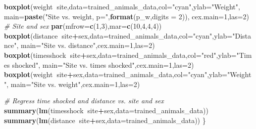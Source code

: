 \documentclass[]{article}
\newenvironment{Shaded}{\begin{snugshade}}{\end{snugshade}}
\newcommand{\KeywordTok}[1]{\textcolor[rgb]{0.13,0.29,0.53}{\textbf{#1}}}
\newcommand{\DataTypeTok}[1]{\textcolor[rgb]{0.13,0.29,0.53}{#1}}
\newcommand{\DecValTok}[1]{\textcolor[rgb]{0.00,0.00,0.81}{#1}}
\newcommand{\StringTok}[1]{\textcolor[rgb]{0.31,0.60,0.02}{#1}}
\newcommand{\CommentTok}[1]{\textcolor[rgb]{0.56,0.35,0.01}{\textit{#1}}}
\newcommand{\OperatorTok}[1]{\textcolor[rgb]{0.81,0.36,0.00}{\textbf{#1}}}
\newcommand{\NormalTok}[1]{#1}
\begin{document}
\begin{Shaded}
\begin{Highlighting}[]
  \KeywordTok{boxplot}\NormalTok{(weight}\OperatorTok{~}\NormalTok{site,}\DataTypeTok{data=}\NormalTok{trained_animals_data,}\DataTypeTok{col=}\StringTok{"cyan"}\NormalTok{,}\DataTypeTok{ylab=}\StringTok{"Weight"}\NormalTok{,}
        \DataTypeTok{main=}\KeywordTok{paste}\NormalTok{(}\StringTok{"Site vs. weight, p="}\NormalTok{,}\KeywordTok{format}\NormalTok{(p_w,}\DataTypeTok{digits =} \DecValTok{2}\NormalTok{)),}
        \DataTypeTok{cex.main=}\DecValTok{1}\NormalTok{,}\DataTypeTok{las=}\DecValTok{2}\NormalTok{)}
  \CommentTok{# Site and sex}
  \KeywordTok{par}\NormalTok{(}\DataTypeTok{mfrow=}\KeywordTok{c}\NormalTok{(}\DecValTok{1}\NormalTok{,}\DecValTok{3}\NormalTok{),}\DataTypeTok{mar=}\KeywordTok{c}\NormalTok{(}\DecValTok{10}\NormalTok{,}\DecValTok{4}\NormalTok{,}\DecValTok{4}\NormalTok{,}\DecValTok{4}\NormalTok{))}
  \KeywordTok{boxplot}\NormalTok{(distance}\OperatorTok{~}\NormalTok{site}\OperatorTok{+}\NormalTok{sex,}\DataTypeTok{data=}\NormalTok{trained_animals_data,}\DataTypeTok{col=}\StringTok{"cyan"}\NormalTok{,}\DataTypeTok{ylab=}\StringTok{"Distance"}\NormalTok{,}
        \DataTypeTok{main=}\StringTok{"Site vs. distance"}\NormalTok{,}\DataTypeTok{cex.main=}\DecValTok{1}\NormalTok{,}\DataTypeTok{las=}\DecValTok{2}\NormalTok{)}
  \KeywordTok{boxplot}\NormalTok{(timesshock}\OperatorTok{~}\NormalTok{site}\OperatorTok{+}\NormalTok{sex,}\DataTypeTok{data=}\NormalTok{trained_animals_data,}\DataTypeTok{col=}\StringTok{"red"}\NormalTok{,}\DataTypeTok{ylab=}\StringTok{"Times shocked"}\NormalTok{,}
        \DataTypeTok{main=}\StringTok{"Site vs. times shocked"}\NormalTok{,}\DataTypeTok{cex.main=}\DecValTok{1}\NormalTok{,}\DataTypeTok{las=}\DecValTok{2}\NormalTok{)}
  \KeywordTok{boxplot}\NormalTok{(weight}\OperatorTok{~}\NormalTok{site}\OperatorTok{+}\NormalTok{sex,}\DataTypeTok{data=}\NormalTok{trained_animals_data,}\DataTypeTok{col=}\StringTok{"cyan"}\NormalTok{,}\DataTypeTok{ylab=}\StringTok{"Weight"}\NormalTok{,}
        \DataTypeTok{main=}\StringTok{"Site vs. weight"}\NormalTok{,}\DataTypeTok{cex.main=}\DecValTok{1}\NormalTok{,}\DataTypeTok{las=}\DecValTok{2}\NormalTok{)}

  \CommentTok{# Regress time shocked and distance vs. site and sex}
  \KeywordTok{summary}\NormalTok{(}\KeywordTok{lm}\NormalTok{(timesshock}\OperatorTok{~}\NormalTok{site}\OperatorTok{+}\NormalTok{sex,}\DataTypeTok{data=}\NormalTok{trained_animals_data))}
  \KeywordTok{summary}\NormalTok{(}\KeywordTok{lm}\NormalTok{(distance}\OperatorTok{~}\NormalTok{site}\OperatorTok{+}\NormalTok{sex,}\DataTypeTok{data=}\NormalTok{trained_animals_data))  }
\NormalTok{  \}}
\end{Highlighting}
\end{Shaded}
\end{document}
